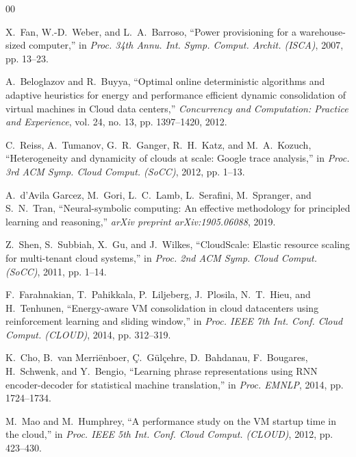 \documentclass[conference]{IEEEtran}
\begin{document}
\begin{thebibliography}{00}

X.~Fan, W.-D.~Weber, and L.~A.~Barroso, ``Power provisioning for a warehouse-sized computer,'' in \emph{Proc. 34th Annu. Int. Symp. Comput. Archit. (ISCA)}, 2007, pp. 13--23.

A.~Beloglazov and R.~Buyya, ``Optimal online deterministic algorithms and adaptive heuristics for energy and performance efficient dynamic consolidation of virtual machines in Cloud data centers,'' \emph{Concurrency and Computation: Practice and Experience}, vol. 24, no. 13, pp. 1397--1420, 2012.

C.~Reiss, A.~Tumanov, G.~R.~Ganger, R.~H.~Katz, and M.~A.~Kozuch, ``Heterogeneity and dynamicity of clouds at scale: Google trace analysis,'' in \emph{Proc. 3rd ACM Symp. Cloud Comput. (SoCC)}, 2012, pp. 1--13.

A.~d'Avila Garcez, M.~Gori, L.~C.~Lamb, L.~Serafini, M.~Spranger, and S.~N.~Tran, ``Neural-symbolic computing: An effective methodology for principled learning and reasoning,'' \emph{arXiv preprint arXiv:1905.06088}, 2019.

Z.~Shen, S.~Subbiah, X.~Gu, and J.~Wilkes, ``CloudScale: Elastic resource scaling for multi-tenant cloud systems,'' in \emph{Proc. 2nd ACM Symp. Cloud Comput. (SoCC)}, 2011, pp. 1--14.

F.~Farahnakian, T.~Pahikkala, P.~Liljeberg, J.~Plosila, N.~T.~Hieu, and H.~Tenhunen, ``Energy-aware VM consolidation in cloud datacenters using reinforcement learning and sliding window,'' in \emph{Proc. IEEE 7th Int. Conf. Cloud Comput. (CLOUD)}, 2014, pp. 312--319.

K.~Cho, B.~van Merri{\"e}nboer, {\c{C}}.~G{\"u}l{\c{c}}ehre, D.~Bahdanau, F.~Bougares, H.~Schwenk, and Y.~Bengio, ``Learning phrase representations using RNN encoder-decoder for statistical machine translation,'' in \emph{Proc. EMNLP}, 2014, pp. 1724--1734.

M.~Mao and M.~Humphrey, ``A performance study on the VM startup time in the cloud,'' in \emph{Proc. IEEE 5th Int. Conf. Cloud Comput. (CLOUD)}, 2012, pp. 423--430.

\end{thebibliography}
\end{document}

